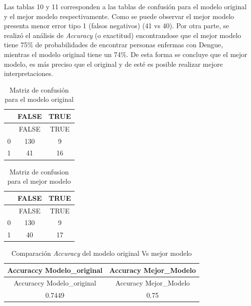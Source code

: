 \documentclass[
]{article}
\begin{document}
Las tablas 10 y 11 corresponden a las tablas de confusión para el modelo
original y el mejor modelo respectivamente. Como se puede observar el
mejor modelo presenta menor error tipo 1 (falsos negativos) (41 vs 40).
Por otra parte, se realizó el análisis de \emph{Accuracy} (o exactitud)
encontrandose que el mejor modelo tiene 75\% de probabilidades de
encontrar personas enfermas con Dengue, mientras el modelo original
tiene un 74\%. De esta forma se concluye que el mejor modelo, es más
preciso que el original y de esté es posible realizar mejore
interpretaciones.

\begin{longtable}[]{@{}lcc@{}}
\caption{Matriz de confusión para el modelo original}\tabularnewline
\toprule
& FALSE & TRUE\tabularnewline
\midrule
\endfirsthead
\toprule
& FALSE & TRUE\tabularnewline
\midrule
\endhead
0 & 130 & 9\tabularnewline
1 & 41 & 16\tabularnewline
\bottomrule
\end{longtable}

\begin{longtable}[]{@{}lcc@{}}
\caption{Matriz de confusion para el mejor modelo}\tabularnewline
\toprule
& FALSE & TRUE\tabularnewline
\midrule
\endfirsthead
\toprule
& FALSE & TRUE\tabularnewline
\midrule
\endhead
0 & 130 & 9\tabularnewline
1 & 40 & 17\tabularnewline
\bottomrule
\end{longtable}

\begin{longtable}[]{@{}cc@{}}
\caption{Comparación \emph{Accuracy} del modelo original Vs mejor
modelo}\tabularnewline
\toprule
Accuraccy Modelo\_original & Accuracy Mejor\_Modelo\tabularnewline
\midrule
\endfirsthead
\toprule
Accuraccy Modelo\_original & Accuracy Mejor\_Modelo\tabularnewline
\midrule
\endhead
0.7449 & 0.75\tabularnewline
\bottomrule
\end{longtable}
\end{document}
